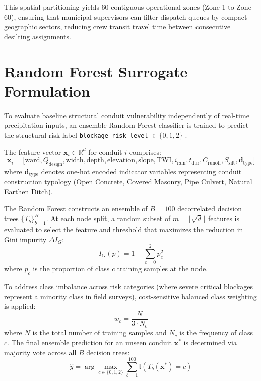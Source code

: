 \documentclass[12pt,a4paper]{report}
\begin{document}
This spatial partitioning yields 60 contiguous operational zones (Zone 1 to Zone 60), ensuring that municipal supervisors can filter dispatch queues by compact geographic sectors, reducing crew transit travel time between consecutive desilting assignments.

\section{Random Forest Surrogate Formulation}
To evaluate baseline structural conduit vulnerability independently of real-time precipitation inputs, an ensemble Random Forest classifier is trained to predict the structural risk label \texttt{blockage\_risk\_level} $\in \{0, 1, 2\}$ \cite{breiman2001random}.

The feature vector $\mathbf{x}_i \in \mathbb{R}^{d}$ for conduit $i$ comprises:
\begin{equation}
\mathbf{x}_i = \big[\text{ward}, Q_{\text{design}}, \text{width}, \text{depth}, \text{elevation}, \text{slope}, \text{TWI}, i_{\text{rain}}, t_{\text{dur}}, C_{\text{runoff}}, S_{\text{silt}}, \mathbf{d}_{\text{type}}\big]
\end{equation}
where $\mathbf{d}_{\text{type}}$ denotes one-hot encoded indicator variables representing conduit construction typology (Open Concrete, Covered Masonry, Pipe Culvert, Natural Earthen Ditch).

The Random Forest constructs an ensemble of $B = 100$ decorrelated decision trees $\{T_b\}_{b=1}^B$. At each node split, a random subset of $m = \lfloor\sqrt{d}\rfloor$ features is evaluated to select the feature and threshold that maximizes the reduction in Gini impurity $\Delta I_G$:
\begin{equation}
I_G(p) = 1 - \sum_{c=0}^2 p_c^2
\label{eqn:gini_impurity}
\end{equation}
where $p_c$ is the proportion of class $c$ training samples at the node. 

To address class imbalance across risk categories (where severe critical blockages represent a minority class in field surveys), cost-sensitive balanced class weighting is applied:
\begin{equation}
w_c = \frac{N}{3 \cdot N_c}
\label{eqn:class_weights}
\end{equation}
where $N$ is the total number of training samples and $N_c$ is the frequency of class $c$. The final ensemble prediction for an unseen conduit $\mathbf{x}^*$ is determined via majority vote across all $B$ decision trees:
\begin{equation}
\hat{y} = \arg\max_{c \in \{0, 1, 2\}} \sum_{b=1}^{100} \mathbb{I}\left(T_b(\mathbf{x}^*) = c\right)
\end{equation}
\end{document}
